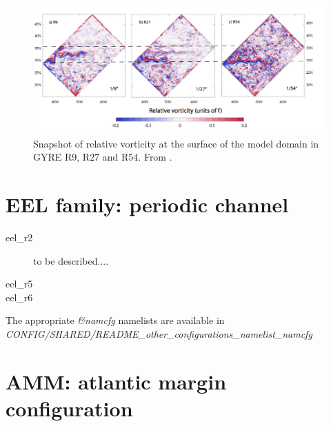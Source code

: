 \begin{figure}[!t]   \begin{center}
\includegraphics[width=1.0\textwidth]{./TexFiles/Figures/Fig_GYRE.pdf}
\caption{  \label{Fig_GYRE}   
Snapshot of relative vorticity at the surface of the model domain 
in GYRE R9, R27 and R54. From \citet{Levy_al_OM10}.}
\end{center}   \end{figure}

\section{EEL family: periodic channel}
\label{MISC_config_EEL}

\begin{description}
\item[eel\_r2]  to be described....
\item[eel\_r5]  
\item[eel\_r6]  
\end{description}
The appropriate \textit{\&namcfg} namelists are available in  
\textit{CONFIG/SHARED/README\_other\_configurations\_namelist\_namcfg}
\section{AMM: atlantic margin configuration }
\label{MISC_config_AMM}

